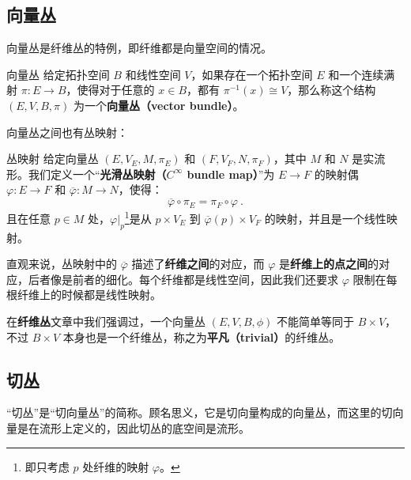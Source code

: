 \begin{issues}
\issueDraft
\end{issues}


\subsection{向量丛}


向量丛是纤维丛的特例，即纤维都是向量空间的情况。

\begin{definition}{向量丛}
给定拓扑空间 $B$ 和线性空间 $V$，如果存在一个拓扑空间 $E$ 和一个连续满射 $\pi:E\rightarrow B$，使得对于任意的 $x\in B$，都有 $\pi^{-1}(x)\cong V$，那么称这个结构 $(E, V, B, \pi)$ 为一个\textbf{向量丛（vector bundle）}。
\end{definition}

向量丛之间也有丛映射：

\begin{definition}{丛映射}
给定向量丛 $(E, V_E, M, \pi_E)$ 和 $(F, V_F, N, \pi_F)$，其中 $M$ 和 $N$ 是实流形。我们定义一个“\textbf{光滑丛映射（$C^\infty$ bundle map）}”为 $E\rightarrow F$ 的映射偶 $\varphi: E\rightarrow F$ 和 $\overline{\varphi}: M\rightarrow N$，使得：
\begin{equation}
\overline{\varphi}\circ\pi_E=\pi_F\circ\varphi~.
\end{equation}
且在任意 $p\in M$ 处，$\varphi|_p$\footnote{即只考虑 $p$ 处纤维的映射 $\varphi$。}是从 $p\times V_E$ 到 $\overline{\varphi}(p)\times V_F$ 的映射，并且是一个线性映射。
\end{definition}

直观来说，丛映射中的 $\overline{\varphi}$ 描述了\textbf{纤维之间}的对应，而 $\varphi$ 是\textbf{纤维上的点之间}的对应，后者像是前者的细化。每个纤维都是线性空间，因此我们还要求 $\varphi$ 限制在每根纤维上的时候都是线性映射。

在\textbf{纤维丛}文章中我们强调过，一个向量丛 $(E, V, B, \phi)$ 不能简单等同于 $B\times V$，不过 $B\times V$ 本身也是一个纤维丛，称之为\textbf{平凡（trivial）}的纤维丛。




\subsection{切丛}
“切丛”是“切向量丛”的简称。顾名思义，它是切向量构成的向量丛，而这里的切向量是在流形上定义的，因此切丛的底空间是流形。

